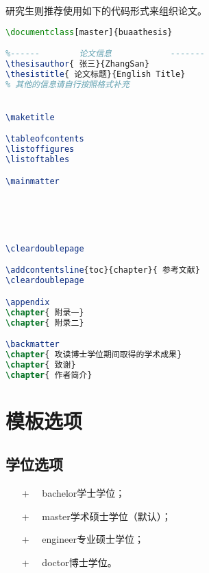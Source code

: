 \qquad 研究生则推荐使用如下的代码形式来组织论文。\par
\begin{lstlisting}[language={LaTeX}]
\documentclass[master]{buaathesis}

%------        论文信息            -------
\thesisauthor{ 张三}{ZhangSan}
\thesistitle{ 论文标题}{English Title}
% 其他的信息请自行按照格式补充


\maketitle

\tableofcontents
\listoffigures
\listoftables

\mainmatter





\cleardoublepage

\addcontentsline{toc}{chapter}{ 参考文献}
\cleardoublepage

\appendix
\chapter{ 附录一}
\chapter{ 附录二}

\backmatter
\chapter{ 攻读博士学位期间取得的学术成果}
\chapter{ 致谢}
\chapter{ 作者简介}


\end{lstlisting}

    \section{模板选项}
        \subsection{学位选项}
        \begin{itemize}
            \item[+] ~~bachelor\quad 学士学位；\\
            \item[+] ~~master\quad 学术硕士学位（默认）；\\
            \item[+] ~~engineer\quad 专业硕士学位；\\
            \item[+] ~~doctor\quad 博士学位。\\
        \end{itemize}
